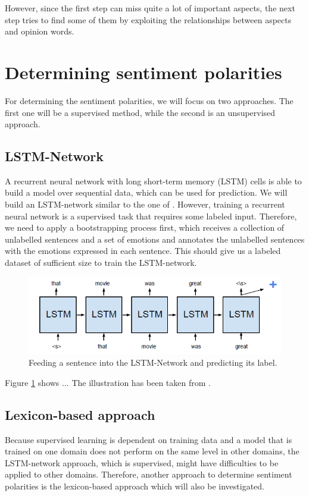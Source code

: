 \documentclass[10pt,a4paper]{article}
\begin{document}
	However, since the first step can miss quite a lot of important aspects, the next step tries to find some of them by exploiting the relationships between aspects and opinion words.
	
	\section{Determining sentiment polarities}
	For determining the sentiment polarities, we will focus on two approaches. The first one will be a supervised method, while the second is an unsupervised approach.
	
		\subsection{LSTM-Network}
		A recurrent neural network with long short-term memory (LSTM) cells is able to build a model over sequential data, which can be used for prediction. We will build an LSTM-network similar to the one of \cite{hongsentiment}. However, training a recurrent neural network is a supervised task that requires some labeled input. Therefore, we need to apply a bootstrapping process first, which receives a collection of unlabelled sentences and a set of emotions and annotates the unlabelled sentences with the emotions expressed in each sentence. This should give us a labeled dataset of sufficient size to train the LSTM-network.
		
		\begin{figure}[h]
			\centering
			\includegraphics[width=0.7\linewidth]{data/lstm}
			\caption{Feeding a sentence into the LSTM-Network and predicting its label.}
			\label{fig:lstm}
		\end{figure}
		
		Figure \ref{fig:lstm} shows ... The illustration has been taken from \cite{hongsentiment}.
		
		\subsection{Lexicon-based approach}
		Because supervised learning is dependent on training data and a model that is trained on one domain does not perform on the same level in other domains, the LSTM-network approach, which is supervised, might have difficulties to be applied to other domains. Therefore, another approach to determine sentiment polarities is the lexicon-based approach which will also be investigated.
		
\end{document}
